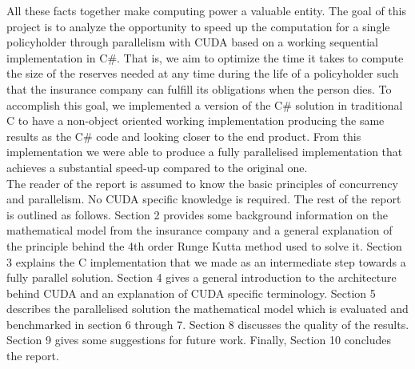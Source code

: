 All these facts together make computing power a valuable entity. The goal of this project is to analyze the opportunity to speed up the computation for a single policyholder through parallelism with CUDA based on a working sequential implementation in C\#. That is,  we aim to optimize the time it takes to compute the size of the reserves needed at any time during the life of a policyholder such that the insurance company can fulfill its obligations when the person dies. To accomplish this goal, we implemented a version of the C\# solution in traditional C to have a non-object oriented working implementation producing the same results as the C\# code and looking closer to the end product. From this implementation we were able to produce a fully parallelised implementation that achieves a substantial speed-up compared to the original one.\\

The reader of the report is assumed to know the basic principles of concurrency and parallelism. No CUDA specific knowledge is required. The rest of the report is outlined as follows. Section 2 provides some background information on the mathematical model from the insurance company and a general explanation of the principle behind the 4th order Runge Kutta method used to solve it. Section 3 explains the C implementation that we made as an intermediate step towards a fully parallel solution. Section 4 gives a general introduction to the architecture behind CUDA and an explanation of CUDA specific terminology. Section 5 describes the parallelised solution the mathematical model which is evaluated and benchmarked in section 6 through 7. Section 8 discusses the quality of the results. Section 9 gives some suggestions for future work. Finally, Section 10 concludes the report.
